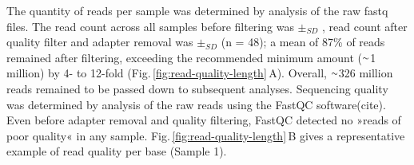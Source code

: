 \begin{method}
The quantity of reads per sample was determined by analysis of the raw fastq files. The read count across all samples before filtering was  $\pm_{SD}$ , read count after quality filter and adapter removal was  $\pm_{SD}$  (n = 48); a mean of 87\% of reads remained after filtering, exceeding the recommended minimum amount ($\smallsim$\num{1} million) by 4- to 12-fold (Fig.\,\ref{fig:read-quality-length}\,A). Overall, $\smallsim$326 million reads remained to be passed down to subsequent analyses. Sequencing quality was determined by analysis of the raw reads using the FastQC software(cite). Even before adapter removal and quality filtering, FastQC detected no »reads of poor quality« in any sample. Fig.\,\ref{fig:read-quality-length}\,B gives a representative example of read quality per base (Sample \num{1}).

\end{method}

